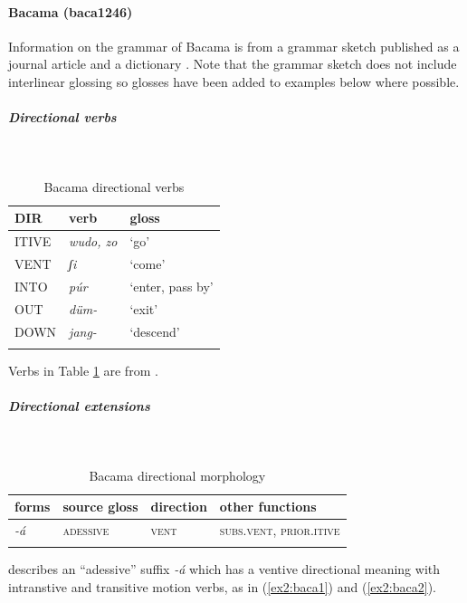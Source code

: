 \paragraph*{Bacama (baca1246)} \label{baca}

Information on the grammar of Bacama is from a grammar sketch published as a journal article \citep{carnochanCategoriesVerbalPiece1970} and a dictionary \citep{pweddonBwatiyeEnglishDictionary2001}. Note that the grammar sketch does not include interlinear glossing so glosses have been added to examples below where possible. 

\subparagraph{Directional verbs}~

\begin{table}[H]
	\caption{Bacama directional verbs} 
	\label{tab:bacaV}
	\begin{tabular}{lll} %
		\lsptoprule
		DIR & verb & gloss   \\ %
		\midrule
		ITIVE & \textit{wudo, zo} & `go' \\
		VENT & \textit{ʃi} & `come' \\
		INTO& \textit{púr} & `enter, pass by' \\
		OUT & \textit{düm-} & `exit' \\
		DOWN & \textit{jang-} & `descend' \\		
		\lspbottomrule
	\end{tabular}
\end{table}

Verbs in Table \ref{tab:bacaV} are from \citet{pweddonBwatiyeEnglishDictionary2001}.

\subparagraph{Directional extensions}~

\begin{table}[H]
	\caption{Bacama directional morphology}
	\label{tab:baca}
	\begin{tabular}{llll} %
		\lsptoprule
		forms & source gloss & direction  & other functions  \\ %
		\midrule
		\textit{-á}  &  \textsc{adessive}  &  \textsc{vent} &   \textsc{subs.vent}, \textsc{prior.itive}  \\
		\lspbottomrule
	\end{tabular}
\end{table} 

\citet{carnochanCategoriesVerbalPiece1970} describes an ``adessive'' suffix \textit{-á} which has a ventive directional meaning with intranstive and transitive motion verbs, as in (\ref{ex2:baca1}) and (\ref{ex2:baca2}).

